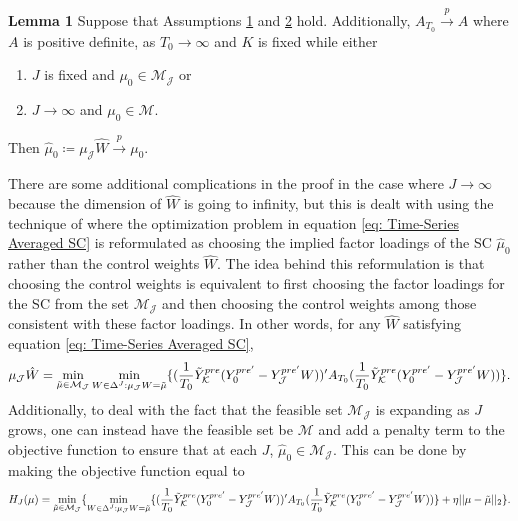 \documentclass{article}
\begin{document}
\textbf{Lemma 1} \label{L1} Suppose that Assumptions \hyperref[A1]{1} and \hyperref[A2]{2} hold. Additionally, $A_{T_0} \overset{p}{\rightarrow} A$ where $A$ is positive definite, as $T_0 \rightarrow \infty$ and $K$ is fixed while either
\begin{enumerate}[label=(\roman*)]
    \item $J$ is fixed and $\mu_0 \in \mathcal{M}_{\mathcal{J}}$ or
    \item $J \rightarrow \infty$ and $\mu_0 \in \mathcal{M}$.
\end{enumerate}
Then $\hat{\mu}_0 \coloneqq \mu_{\mathcal{J}}\hat{W} \overset{p}{\rightarrow} \mu_0$. 
\par 
 There are some additional complications in the proof in the case where $J \rightarrow \infty$ because the dimension of $\hat{W}$ is going to infinity, but this is dealt with using the technique of \cite{LargeSampleProperties} where the optimization problem in equation \eqref{eq: Time-Series Averaged SC} is reformulated as choosing the implied factor loadings of the SC $\hat{\mu}_0$ rather than the control weights $\hat{W}$. The idea behind this reformulation is that choosing the control weights is equivalent to first choosing the factor loadings for the SC from the set $\mathcal{M}_{\mathcal{J}}$ and then choosing the control weights among those consistent with these factor loadings. In other words, for any $\hat{W}$ satisfying equation \eqref{eq: Time-Series Averaged SC},
\begin{equation*}
    \mu_{\mathcal{J}}\hat{W} = \min_{\Tilde{\mu} \in \mathcal{M}_{\mathcal{J}}} \min_{W \in \Delta^J: \mu_{\mathcal{J}} W = \Tilde{\mu}} \{  (\frac{1}{T_0} \Tilde{Y}_{\mathcal{K}}^{pre}(Y_{0}^{pre'} - Y_{\mathcal{J}}^{pre'}W))'A_{T_0}(\frac{1}{T_0} \Tilde{Y}_{\mathcal{K}}^{pre}(Y_{0}^{pre'} - Y_{\mathcal{J}}^{pre'}W))  \}.
\end{equation*}
Additionally, to deal with the fact that the feasible set $\mathcal{M}_{\mathcal{J}}$ is expanding as $J$ grows, one can instead have the feasible set be $\mathcal{M}$ and add a penalty term to the objective function to ensure that at each $J$, $\hat{\mu}_0 \in \mathcal{M}_{\mathcal{J}}$. This can be done by making the objective function equal to 
 \begin{equation*}
    H_J(\mu) =  \min_{\Tilde{\mu} \in \mathcal{M}_{\mathcal{J}}} \{ \min_{W \in \Delta^J: \mu_{\mathcal{J}} W = \Tilde{\mu}} \{  (\frac{1}{T_0} \Tilde{Y}_{\mathcal{K}}^{pre}(Y_{0}^{pre'} - Y_{\mathcal{J}}^{pre'}W))'A_{T_0}(\frac{1}{T_0} \Tilde{Y}_{\mathcal{K}}^{pre}(Y_{0}^{pre'} - Y_{\mathcal{J}}^{pre'}W))  \} + \eta||\mu - \Tilde{\mu}||_2 \}.
\end{equation*}
\end{document}
